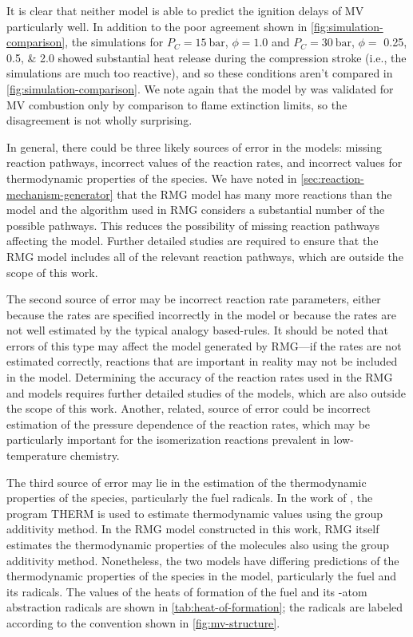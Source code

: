 \documentclass[letterpaper, review]{elsarticle}
\begin{document}
It is clear that neither model is able to predict the ignition delays of MV particularly well. In
addition to the poor agreement shown in \cref{fig:simulation-comparison}, the simulations for
\(P_C = \SI{15}{\bar}\), \(\phi=1.0\) and \(P_C = \SI{30}{\bar}\), \(\phi=\) \numlist{0.25;0.5;2.0}
showed substantial heat release during the compression stroke (i.e., the simulations are much too
reactive), and so these conditions aren't compared in \cref{fig:simulation-comparison}. We note
again that the model by \citet{Dievart2013} was validated for MV combustion only by comparison to
flame extinction limits, so the disagreement is not wholly surprising.

In general, there could be three likely sources of error in the models: missing reaction pathways,
incorrect values of the reaction rates, and incorrect values for thermodynamic properties of the
species. We have noted in \cref{sec:reaction-mechanism-generator} that the RMG model has many more
reactions than the \citet{Dievart2013} model and the algorithm used in RMG considers a substantial
number of the possible pathways. This reduces the possibility of missing reaction pathways affecting
the model. Further detailed studies are required to ensure that the RMG model includes all of the
relevant reaction pathways, which are outside the scope of this work.

The second source of error may be incorrect reaction rate parameters, either because the rates are
specified incorrectly in the model or because the rates are not well estimated by the
typical analogy based-rules. It should be noted that errors of this type may affect the model
generated by RMG---if the rates are not estimated correctly, reactions that are important in reality
may not be included in the model. Determining the accuracy of the reaction rates used in the RMG and
\citet{Dievart2013} models requires further detailed studies of the models, which are also outside
the scope of this work. Another, related, source of error could be incorrect estimation of the
pressure dependence of the reaction rates, which may be particularly important for the isomerization
reactions prevalent in low-temperature chemistry.

The third source of error may lie in the estimation of the thermodynamic properties of the species,
particularly the fuel radicals. In the work of \citet{Dievart2013}, the program THERM
\cite{Ritter1991} is used to estimate thermodynamic values using the group additivity method. In the
RMG model constructed in this work, RMG itself estimates the thermodynamic properties of the
molecules also using the group additivity method. Nonetheless, the two models have differing
predictions of the thermodynamic properties of the species in the model, particularly the fuel and
its radicals. The values of the heats of formation of the fuel and its -atom abstraction
radicals are shown in \cref{tab:heat-of-formation}; the radicals are labeled according to the
convention shown in \cref{fig:mv-structure}.
\end{document}
